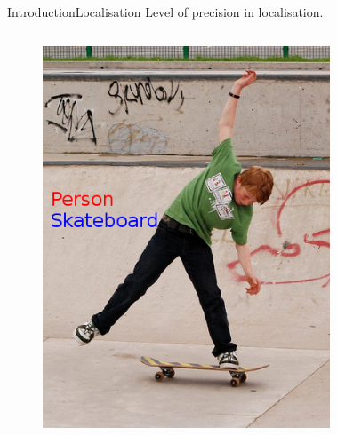 \begin{frame}{Introduction}{Localisation}
    Level of precision in localisation.
    \begin{columns}
            \begin{figure}
                \includegraphics[width=1.0 \textwidth]{figs/objfieldscat.png}
            \end{figure}
        \begin{figure}

\end{figure}
\end{columns}
\end{frame}
